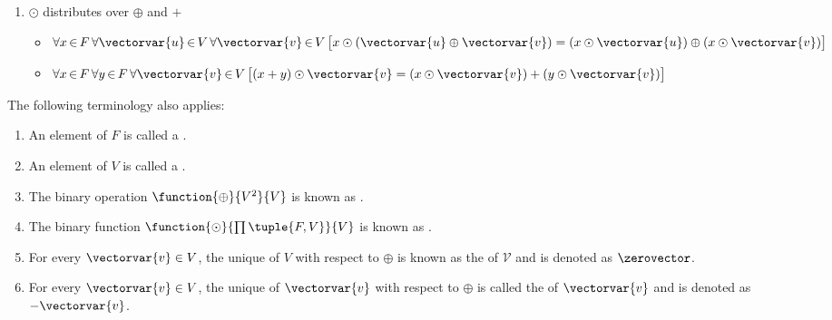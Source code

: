 \begin{dfn}
\begin{enumerate}[topsep=2pt,noitemsep,label=\textup{\texttt{(\alph*)}}]
            \label{enum:vector-space-scalar-multiplication-with-1-yields-the-original-vector}
        \item \( \odot \) distributes over \( \oplus \) and \( + \)  \label{enum:vector-space-scalar-multiplication-distributes-over-vector-and-field-addition}
            \begin{itemize}
                \setlength{\itemsep}{0.1em}
                \item \( \forall x\,{\in}\,F \, \forall \vectorvar{u}\,{\in}\,V \, \forall \vectorvar{v}\,{\in}\,V \,
                    \big[ x \odot \mleft( \vectorvar{u} \oplus \vectorvar{v} \mright) = \mleft( x \odot \vectorvar{u} \mright)
                    \oplus \mleft( x \odot \vectorvar{v} \mright)\big] \)
                \item \( \forall x\,{\in}\,F \, \forall y\,{\in}\,F \, \forall \vectorvar{v}\,{\in}\,V \,
                    \big[ \mleft( x + y \mright) \odot \vectorvar{v} = \mleft( x \odot \vectorvar{v} \mright) + \mleft( y \odot \vectorvar{v} \mright)  \big]\)
            \end{itemize}
    \end{enumerate}
    The following terminology also applies:
    \begin{enumerate}[topsep=2pt,noitemsep,label=\textup{\texttt{(\arabic*)}}]
        \setlength{\itemsep}{0.1em}
        \item An element of \( F \) is called a .  \label{enum:vector-space-scalar}
        \item An element of \( V \) is called a .  \label{enum:vector-space-vector}
        \item The binary operation \( \function{\oplus}{V^{2}}{V} \) is known as .  \label{enum:vector-space-vector-addition}
        \item The binary function \( \function{\odot}{\prod \tuple{F,V}}{V} \) is known as .
             \label{enum:vector-space-scalar-multiplication}
        \item For every \( \vectorvar{v} \in V \), \label{enum:vector-space-zero-vector}
            the unique  of \( V \) with respect to \( \oplus \)
            is known as the  of \( \mathcal{V} \) and is denoted as \( \zerovector \).
        \item For every \( \vectorvar{v} \in V \), the unique  of
            \( \vectorvar{v} \) with respect to \( \oplus \) is called the  of \( \vectorvar{v} \) and is denoted as \( -\vectorvar{v} \).
             \label{enum:vector-space-additive-inverse}
    \end{enumerate}
\end{dfn}

